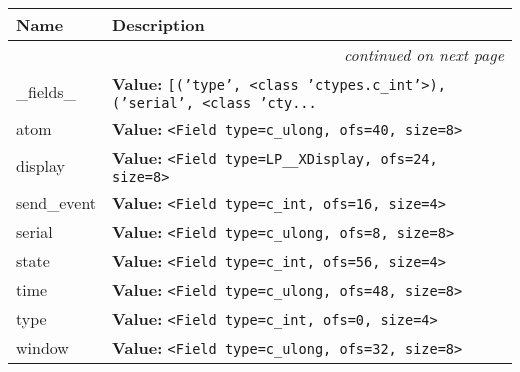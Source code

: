     \vspace{-1cm}
\hspace{\varindent}\begin{longtable}{|p{\varnamewidth}|p{\vardescrwidth}|l}
\cline{1-2}
\cline{1-2} \centering \textbf{Name} & \centering \textbf{Description}& \\
\cline{1-2}
\endhead\cline{1-2}\multicolumn{3}{r}{\small\textit{continued on next page}}\\\endfoot\cline{1-2}
\endlastfoot\raggedright \_\-f\-i\-e\-l\-d\-s\-\_\- & \raggedright \textbf{Value:} 
{\tt \texttt{[}\texttt{(}\texttt{'}\texttt{type}\texttt{'}\texttt{, }{\textless}class 'ctypes.c\_int'{\textgreater}\texttt{)}\texttt{, }\texttt{(}\texttt{'}\texttt{serial}\texttt{'}\texttt{, }{\textless}class 'cty\texttt{...}}&\\
\cline{1-2}
\raggedright a\-t\-o\-m\- & \raggedright \textbf{Value:} 
{\tt {\textless}Field type=c\_ulong, ofs=40, size=8{\textgreater}}&\\
\cline{1-2}
\raggedright d\-i\-s\-p\-l\-a\-y\- & \raggedright \textbf{Value:} 
{\tt {\textless}Field type=LP\_\_XDisplay, ofs=24, size=8{\textgreater}}&\\
\cline{1-2}
\raggedright s\-e\-n\-d\-\_\-e\-v\-e\-n\-t\- & \raggedright \textbf{Value:} 
{\tt {\textless}Field type=c\_int, ofs=16, size=4{\textgreater}}&\\
\cline{1-2}
\raggedright s\-e\-r\-i\-a\-l\- & \raggedright \textbf{Value:} 
{\tt {\textless}Field type=c\_ulong, ofs=8, size=8{\textgreater}}&\\
\cline{1-2}
\raggedright s\-t\-a\-t\-e\- & \raggedright \textbf{Value:} 
{\tt {\textless}Field type=c\_int, ofs=56, size=4{\textgreater}}&\\
\cline{1-2}
\raggedright t\-i\-m\-e\- & \raggedright \textbf{Value:} 
{\tt {\textless}Field type=c\_ulong, ofs=48, size=8{\textgreater}}&\\
\cline{1-2}
\raggedright t\-y\-p\-e\- & \raggedright \textbf{Value:} 
{\tt {\textless}Field type=c\_int, ofs=0, size=4{\textgreater}}&\\
\cline{1-2}
\raggedright w\-i\-n\-d\-o\-w\- & \raggedright \textbf{Value:} 
{\tt {\textless}Field type=c\_ulong, ofs=32, size=8{\textgreater}}&\\
\cline{1-2}
\end{longtable}



